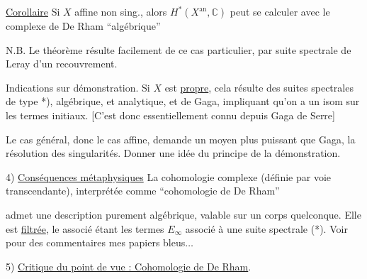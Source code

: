 \uline{Corollaire} 
Si $X$ affine non sing., alors $H^*(X^{\mathrm{an}},\mathbb C)$ peut se calculer avec le complexe de De Rham ``algébrique''

N.B. Le théorème résulte facilement de ce cas particulier, par suite spectrale de Leray d'un recouvrement.

Indications sur démonstration. Si $X$ est \uline{propre}, cela résulte des suites spectrales de type *), algébrique, et analytique, et de Gaga, impliquant qu'on a un isom sur les termes initiaux. [C'est donc essentiellement connu depuis Gaga de Serre]

Le cas général, donc  le cas affine, demande un moyen plus puissant que Gaga, la résolution des singularités. Donner  une idée du principe de la démonstration.

4) \uline{Conséquences métaphysiques}  La cohomologie complexe (définie par voie transcendante), interprétée comme ``cohomologie de De Rham''

admet une description purement algébrique, valable  sur un corps  quelconque.
Elle est \uline{filtrée}, le  associé étant les termes $E_\infty$ associé à une suite spectrale (*). Voir pour des commentaires mes papiers bleus$\ldots$

5) \uline{Critique du point de vue : Cohomologie de De Rham}.



